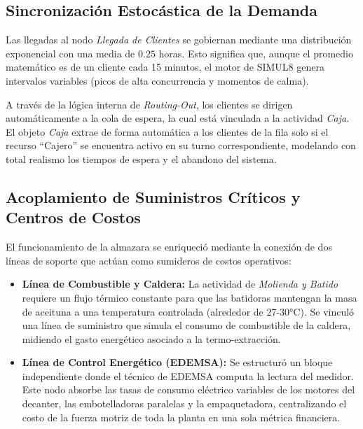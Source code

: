 \documentclass[runningheads]{llncs}
\begin{document}
\subsection{Sincronización Estocástica de la Demanda}
Las llegadas al nodo \textit{Llegada de Clientes} se gobiernan mediante una distribución exponencial con una media de $0.25$ horas. Esto significa que, aunque el promedio matemático es de un cliente cada 15 minutos, el motor de SIMUL8 genera intervalos variables (picos de alta concurrencia y momentos de calma). 

A través de la lógica interna de \textit{Routing-Out}, los clientes se dirigen automáticamente a la cola de espera, la cual está vinculada a la actividad \textit{Caja}. El objeto \textit{Caja} extrae de forma automática a los clientes de la fila solo si el recurso ``Cajero'' se encuentra activo en su turno correspondiente, modelando con total realismo los tiempos de espera y el abandono del sistema.

\subsection{Acoplamiento de Suministros Críticos y Centros de Costos}
El funcionamiento de la almazara se enriqueció mediante la conexión de dos líneas de soporte que actúan como sumideros de costos operativos:
\begin{itemize}
    \item \textbf{Línea de Combustible y Caldera:} La actividad de \textit{Molienda y Batido} requiere un flujo térmico constante para que las batidoras mantengan la masa de aceituna a una temperatura controlada (alrededor de 27-30°C). Se vinculó una línea de suministro que simula el consumo de combustible de la caldera, midiendo el gasto energético asociado a la termo-extracción.
    \item \textbf{Línea de Control Energético (EDEMSA):} Se estructuró un bloque independiente donde el técnico de EDEMSA computa la lectura del medidor. Este nodo absorbe las tasas de consumo eléctrico variables de los motores del decanter, las embotelladoras paralelas y la empaquetadora, centralizando el costo de la fuerza motriz de toda la planta en una sola métrica financiera.
\end{itemize}
\end{document}
